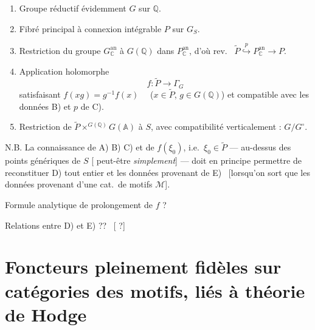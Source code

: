 \documentclass[11pt,a4paper]{article}
\begin{document}
\begin{enumerate}
  \item[A)] Groupe réductif  évidemment $G$ sur $\mathbb{Q}$.
  \item[B)] Fibré principal à connexion intégrable $P$ sur $G_{S}$.
  \item[C)] Restriction du groupe $G_{\mathbb{C}}^{\mathrm{an}}$ à $G(\mathbb{Q})$
  dans $P_{\mathbb{C}}^{\mathrm{an}}$, d'où rev.\ \struck{\ill{}}
  $\widetilde{P} \overset{p}{\hookrightarrow} P_{\mathbb{C}}^{\mathrm{an}} \to P$.
  \item[D)] Application holomorphe
  \[ f : \widetilde{P} \longrightarrow \Gamma_{G} \]
  satisfaisant $f(xg) = g^{-1} f(x)$ \ \ ($x \in \widetilde{P}$,
  $g \in G(\mathbb{Q})$) et compatible avec les données B) et $p$ de C).
  \item[E)] Restriction de $\widetilde{P} \times^{G(\mathbb{Q})} G(\mathbb{A})$ à
  $S$, avec compatibilité \struck{\ill{}} verticalement : $G/G^{\circ}$.
\end{enumerate}


N.B. La connaissance de A) B) C) et de $f(\xi_{0})$, i.e.\ $\xi_{0} \in \widetilde{P}$
— au-dessus des points génériques de $S$ [\ill{} peut-être \emph{simplement}] —
doit en principe permettre de reconstituer D) tout entier et les données
provenant de E) \ [lorsqu'on sort \ill{} \ill{} que les données provenant d'une
cat.\ de motifs $\mathcal{M}$].

Formule analytique de prolongement de $f$ ?

Relations entre D) et E) ?? \ [ ?]


\section{Foncteurs pleinement fidèles sur catégories des motifs, liés à théorie de Hodge}

\end{document}
